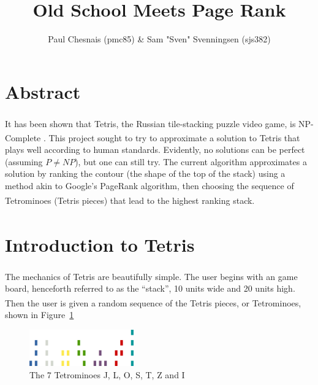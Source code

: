 \documentclass[ fontsize=11pt]{article}
\title{Old School \tetris{} Meets Page Rank}
\author{Paul Chesnais (pmc85) \& Sam "Sven" Svenningsen (sjs382)}
\date{}
\def\tetris{Tetris\textsuperscript{\textregistered}}
\begin{document}
\maketitle
\thispagestyle{empty}
\newpage
\section{Abstract}
\label{sec:abstract}

\par It has been shown that \tetris{}, the Russian tile-stacking puzzle video game, is NP-Complete \cite{tetrishard}. This project sought to try to approximate a solution to \tetris{} that plays well according to human standards. Evidently, no solutions can be perfect (assuming $P \neq NP$), but one can still try. The current algorithm approximates a solution by ranking the contour (the shape of the top of the stack) using a method akin to Google's PageRank algorithm, then choosing the sequence of Tetrominoes (\tetris{} pieces) that lead to the highest ranking stack.

\section{Introduction to \tetris{}}
\label{sec:introduction_to_tetris}
\par The mechanics of \tetris{} are beautifully simple. The user begins with an game board, henceforth referred to as the ``stack'', 10 units wide and 20 units high. Then the user is given a random sequence of the \tetris{} pieces, or Tetrominoes, shown in Figure~\ref{fig:the_7_tetrominoes}

\begin{figure}[H]
  \centering
  \includegraphics[width=0.4\textwidth]{figures/pieces}
  \caption{The 7 Tetrominoes J, L, O, S, T, Z and I }
  \label{fig:the_7_tetrominoes}
\end{figure}
\end{document}
